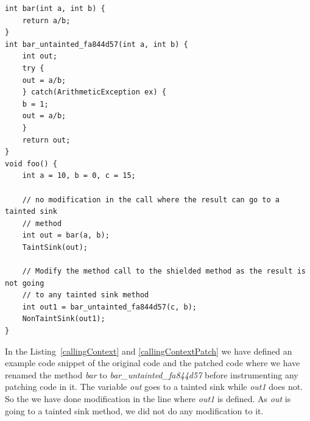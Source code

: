 \begin{lstlisting}[countblanklines=false]
int bar(int a, int b) {
    return a/b;
}
int bar_untainted_fa844d57(int a, int b) {
    int out;
    try {
	out = a/b;
    } catch(ArithmeticException ex) {
	b = 1;
	out = a/b;
    }
    return out;
}
void foo() {
    int a = 10, b = 0, c = 15;

    // no modification in the call where the result can go to a tainted sink
    // method
    int out = bar(a, b);
    TaintSink(out);

    // Modify the method call to the shielded method as the result is not going
    // to any tainted sink method
    int out1 = bar_untainted_fa844d57(c, b);
    NonTaintSink(out1);
}
\end{lstlisting}

In the Listing~\ref{callingContext} and \ref{callingContextPatch} we have
defined an example code snippet of the original code and the patched code where
we have renamed the method \emph{bar} to \emph{bar\_untainted\_fa844d57}
before instrumenting any patching code in it. The variable \emph{out} goes to a
tainted sink while \emph{out1} does not. So the we have done modification in the
line where \emph{out1} is defined. As \emph{out} is going to a tainted sink
method, we did not do any modification to it.






